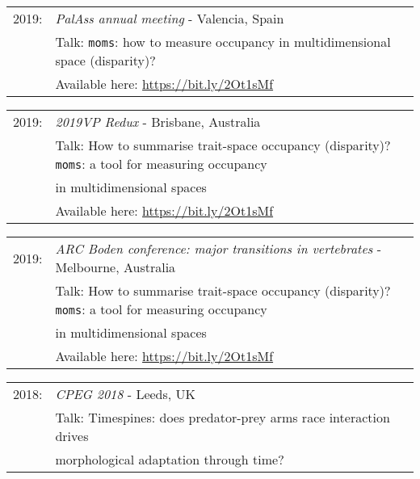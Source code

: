 \documentclass[10pt,a4paper]{article}
\begin{document}
{\begin{tabular}{ll}
2019: & \textit{PalAss annual meeting} - Valencia, Spain\\
      & Talk: \texttt{moms}: how to measure occupancy in multidimensional space (disparity)?\\
      & Available here: \href{https://figshare.com/articles/Shifting_spaces_which_disparity_or_dissimilarity_metrics_best_summarise_occupancy_in_multidimensional_spaces_/9922961}{https://bit.ly/2Ot1sMf}\\
\end{tabular}
\begin{tabular}{ll}
2019: & \textit{2019VP Redux} - Brisbane, Australia\\
      & Talk: How to summarise trait-space occupancy (disparity)? \texttt{moms}: a tool for measuring occupancy\\
      & in multidimensional spaces\\
      & Available here: \href{https://figshare.com/articles/Shifting_spaces_which_disparity_or_dissimilarity_metrics_best_summarise_occupancy_in_multidimensional_spaces_/9922961}{https://bit.ly/2Ot1sMf}\\
\end{tabular}
\begin{tabular}{ll}    
2019: & \textit{ARC Boden conference: major transitions in vertebrates} - Melbourne, Australia\\
      & Talk: How to summarise trait-space occupancy (disparity)? \texttt{moms}: a tool for measuring occupancy\\
      & in multidimensional spaces\\
      & Available here: \href{https://figshare.com/articles/Shifting_spaces_which_disparity_or_dissimilarity_metrics_best_summarise_occupancy_in_multidimensional_spaces_/9922961}{https://bit.ly/2Ot1sMf}\\
\end{tabular}
\begin{tabular}{ll}
2018: & \textit{CPEG 2018} - Leeds, UK\\
      & Talk: Timespines: does predator-prey arms race interaction drives\\
      & morphological adaptation through time?\\
\end{tabular}
\begin{tabular}{ll}

\end{tabular}}
\end{document}
